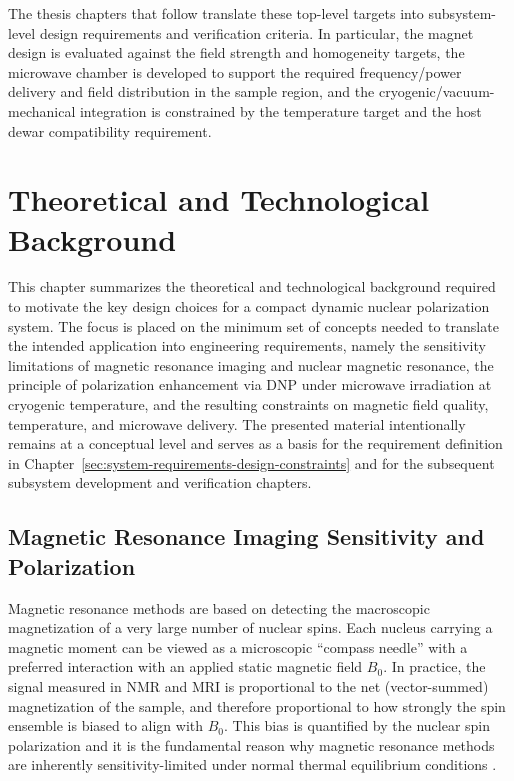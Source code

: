 \documentclass[FM,DP,EN,twoside]{tulthesis}
\begin{document}
The thesis chapters that follow translate these top-level targets into subsystem-level design requirements and verification criteria. In particular, the magnet design is evaluated against the field strength and homogeneity targets, the microwave chamber is developed to support the required frequency/power delivery and field distribution in the sample region, and the cryogenic/vacuum-mechanical integration is constrained by the temperature target and the host dewar compatibility requirement.


\chapter{Theoretical and Technological Background}
\label{sec:theoretical-technological-background}

This chapter summarizes the theoretical and technological background required to motivate the key design choices for a compact dynamic nuclear polarization system. The focus is placed on the minimum set of concepts needed to translate the intended application into engineering requirements, namely the sensitivity limitations of magnetic resonance imaging and nuclear magnetic resonance, the principle of polarization enhancement via DNP under microwave irradiation at cryogenic temperature, and the resulting constraints on magnetic field quality, temperature, and microwave delivery. The presented material intentionally remains at a conceptual level and serves as a basis for the requirement definition in Chapter~\ref{sec:system-requirements-design-constraints} and for the subsequent subsystem development and verification chapters.



\section{Magnetic Resonance Imaging Sensitivity and Polarization}
\label{sec:mri-sensitivity-polarization}
Magnetic resonance methods are based on detecting the macroscopic magnetization of a very large number of nuclear spins. Each nucleus carrying a magnetic moment can be viewed as a microscopic ``compass needle'' with a preferred interaction with an applied static magnetic field $B_0$. In practice, the signal measured in NMR and MRI is proportional to the net (vector-summed) magnetization of the sample, and therefore proportional to how strongly the spin ensemble is biased to align with $B_0$. This bias is quantified by the nuclear spin polarization and it is the fundamental reason why magnetic resonance methods are inherently sensitivity-limited under normal thermal equilibrium conditions \cite{Iannotti1991ss}.
\end{document}
